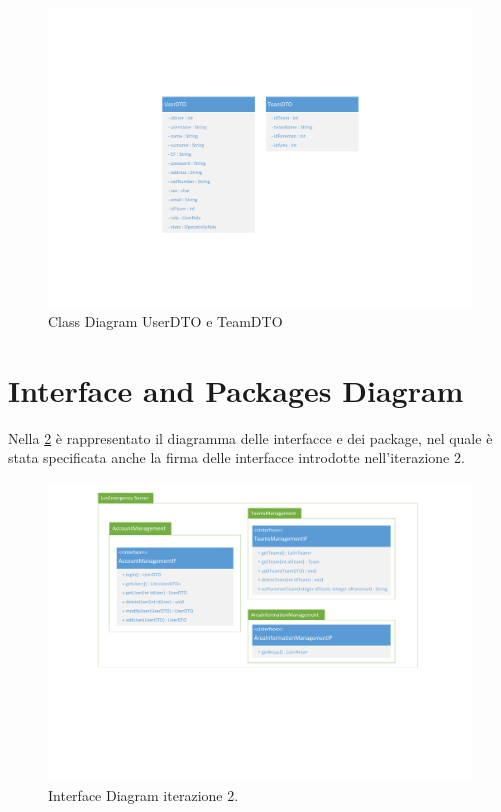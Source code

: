 \begin{figure}[h!]
	\centering
	\includegraphics[width=1\linewidth]{./Iterazione 3/OtherFiles/DTOSpecification}
	\caption{Class Diagram UserDTO e TeamDTO}
	\label{fig:ClassDiagramDTO_iterazione2}
\end{figure}

\clearpage

\section{Interface and Packages Diagram}
Nella \Fig\ref{fig:InterfaceDiagram_iterazione2} è rappresentato il diagramma delle interfacce e dei package, nel quale è stata specificata anche la firma delle interfacce introdotte nell'iterazione 2.

\begin{figure}[h]
	\centering
	\includegraphics[width=1\linewidth]{./Iterazione 2/OtherFiles/UML - Interface Diagram}
	\caption{Interface Diagram iterazione 2.}
	\label{fig:InterfaceDiagram_iterazione2}
\end{figure}
